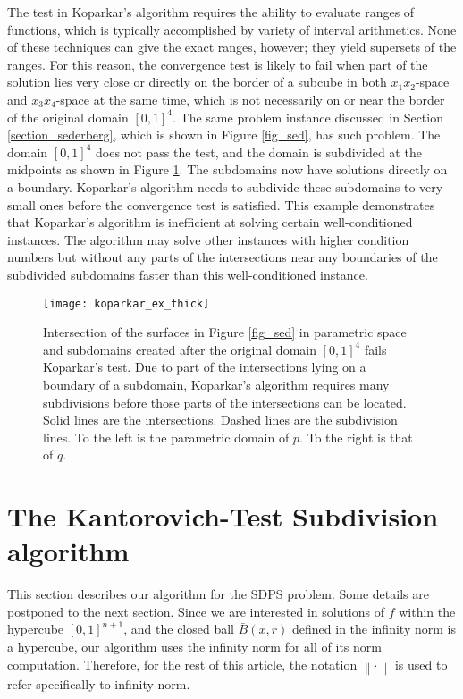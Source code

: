 \documentclass{article}
\newcommand{\norm}[1]{\left\|#1\right\|} \newcommand{\norma}[1]{\left\|#1\right\|}   \newcommand{\inv}[1]{#1^{-1}}
\begin{document}
The test in Koparkar's algorithm requires the ability to evaluate
ranges of functions, which is typically accomplished by variety of
interval arithmetics.  None of these techniques can give the exact
ranges, however; they yield supersets of the ranges.  For this reason,
the convergence test is likely to fail when part of the
solution lies very close or directly on the border of a subcube in
both $x_1 x_2$-space and $x_3 x_4$-space at the same time, which is
not necessarily on or near the border of the original domain
$[0,1]^4$.  The same problem instance discussed in Section
\ref{section_sederberg}, which is shown in Figure \ref{fig_sed}, has
such problem.  The domain $[0,1]^4$ does not pass the test, and the
domain is subdivided at the midpoints as shown in Figure
\ref{fig_koparkar}.  The subdomains now have solutions directly on a
boundary.  Koparkar's algorithm needs to subdivide these subdomains to
very small ones before the convergence test is satisfied.  This
example demonstrates that Koparkar's algorithm is inefficient at
solving certain well-conditioned instances.  The algorithm may solve
other instances with higher condition numbers but without any parts of
the intersections near any boundaries of the subdivided subdomains
faster than this well-conditioned instance.

\begin{figure}
\centering
\texttt{[image: koparkar\_ex\_thick]}
\caption{Intersection of the surfaces in Figure \ref{fig_sed} in parametric space and subdomains created after the original domain $[0,1]^4$ fails Koparkar's test.  Due to part of the intersections lying on a boundary of a subdomain, Koparkar's algorithm requires many subdivisions before those parts of the intersections can be located.  Solid lines are the intersections.  Dashed lines are the subdivision lines. To the left is the parametric domain of $p$.  To the right is that of $q$.}
\label{fig_koparkar}
\end{figure}


\section{The Kantorovich-Test Subdivision algorithm}
\label{sec:algo}

This section describes our algorithm for the SDPS problem. 
Some details are postponed to the next section.
Since we are interested in solutions of $f$ within the hypercube $[0,1]^{n+1}$, and the closed ball $\bar B(x,r)$ defined in the infinity norm is a hypercube, our algorithm uses the infinity norm for all of its norm computation.  Therefore, for
the rest of this article, the notation $\norm{\cdot}$ is used to
refer specifically to infinity norm.
\end{document}

